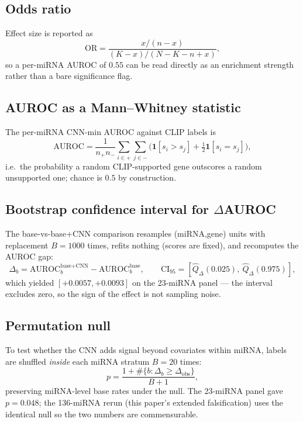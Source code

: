 \subsection{Odds ratio}
Effect size is reported as
\begin{equation}
\mathrm{OR}=\frac{x/(n-x)}{(K-x)/(N-K-n+x)},
\end{equation}
so a per-miRNA AUROC of $0.55$ can be read directly as an enrichment strength
rather than a bare significance flag.

\subsection{AUROC as a Mann--Whitney statistic}
The per-miRNA CNN-min AUROC against CLIP labels is
\begin{equation}
\mathrm{AUROC}=\frac{1}{n_+n_-}\sum_{i\in+}\sum_{j\in-}\Big(\mathbf 1[s_i>s_j]+\tfrac12\mathbf 1[s_i=s_j]\Big),
\end{equation}
i.e.\ the probability a random CLIP-supported gene outscores a random
unsupported one; chance is $0.5$ by construction.

\subsection{Bootstrap confidence interval for $\Delta$AUROC}
The base-vs-base+CNN comparison resamples (miRNA,gene) units with replacement
$B=1000$ times, refits nothing (scores are fixed), and recomputes the AUROC gap:
\begin{equation}
\Delta_b=\mathrm{AUROC}_b^{\text{base+CNN}}-\mathrm{AUROC}_b^{\text{base}},\qquad
\mathrm{CI}_{95}=[\hat Q_{\Delta}(0.025),\ \hat Q_{\Delta}(0.975)],
\end{equation}
which yielded $[+0.0057,+0.0093]$ on the 23-miRNA panel --- the interval
excludes zero, so the sign of the effect is not sampling noise.

\subsection{Permutation null}
To test whether the CNN adds signal beyond covariates within miRNA, labels are
shuffled \emph{inside} each miRNA stratum $B=20$ times:
\begin{equation}
p=\frac{1+\#\{b:\Delta_b\ge\Delta_{\text{obs}}\}}{B+1},
\end{equation}
preserving miRNA-level base rates under the null. The 23-miRNA panel gave
$p=0.048$; the 136-miRNA rerun (this paper's extended falsification) uses the
identical null so the two numbers are commensurable.

